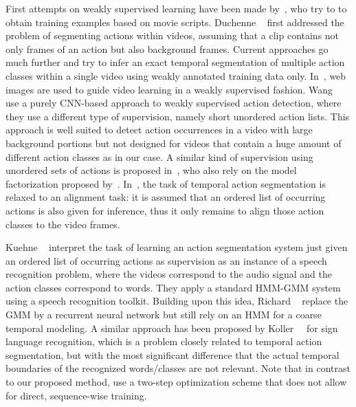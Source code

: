 \documentclass[10pt,twocolumn,letterpaper]{article}
\begin{document}
First attempts on weakly supervised learning have been made by~\cite{laptev08learning,marszalek09actions},
who try to to obtain training examples based on movie scripts.
Duchenne \etal~\cite{duchenne09automatic} first addressed the problem of segmenting
actions within videos, assuming that a clip contains not only frames of an action
but also background frames.
Current approaches go much further and try to infer an exact temporal segmentation
of multiple action classes within a single video using weakly annotated training
data only.
In~\cite{sun15temporal,gan2016webly,gan2016youlead}, web images are used to guide video learning in a weakly supervised fashion.
Wang \etal~\cite{wang2017untrimmed} use a purely CNN-based approach to weakly
supervised action detection, where they use a different type of supervision, namely 
short unordered action lists. This approach is well suited to detect action occurrences in a video with large
background portions but not designed for videos that contain a huge amount of
different action classes as in our case.
A similar kind of supervision using unordered sets of actions is proposed
in~\cite{richard2018actionsets}, who also rely on the model factorization proposed by~\cite{richard2016temporal}.
In~\cite{bojanowski14weakly}, the task of temporal action segmentation is relaxed to an
alignment task: it is assumed that an ordered list of occurring actions is also
given for inference, thus it only remains to align those action classes to the video frames.

Kuehne \etal~\cite{kuehne2017weakly} interpret the task of learning an
action segmentation system just given an ordered list of occurring actions as supervision
as an instance of a speech recognition problem, where the videos correspond to the audio
signal and the action classes correspond to words. They apply a standard HMM-GMM system
using a speech recognition toolkit.
Building upon this idea, Richard \etal~\cite{richard2017weakly} replace the GMM by
a recurrent neural network but still rely on an HMM for a coarse temporal modeling. 
A similar approach has been proposed by Koller~\etal~\cite{koller2016deephand,koller2017resign}
for sign language recognition, which is a problem closely related to temporal action segmentation,
but with the most significant difference that the actual temporal boundaries of the recognized words/classes are not relevant.
Note that in contrast to our proposed method, \cite{kuehne2017weakly,richard2017weakly,koller2016deephand,koller2017resign}
use a two-step optimization scheme that does not allow for direct, sequence-wise training.
\end{document}
